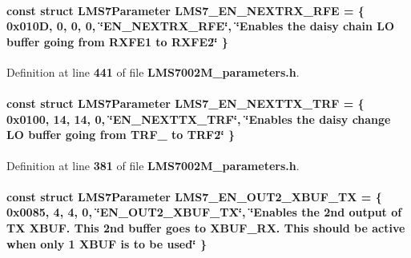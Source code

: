 \paragraph[{L\+M\+S7\+\_\+\+E\+N\+\_\+\+N\+E\+X\+T\+R\+X\+\_\+\+R\+FE}]{\setlength{\rightskip}{0pt plus 5cm}const struct {\bf L\+M\+S7\+Parameter} L\+M\+S7\+\_\+\+E\+N\+\_\+\+N\+E\+X\+T\+R\+X\+\_\+\+R\+FE = \{ 0x010\+D, 0, 0, 0, \char`\"{}\+E\+N\+\_\+\+N\+E\+X\+T\+R\+X\+\_\+\+R\+F\+E\char`\"{}, \char`\"{}\+Enables the daisy chain L\+O buffer going from R\+X\+F\+E1 to R\+X\+F\+E2\char`\"{} \}\hspace{0.3cm}{\ttfamily [static]}}\label{LMS7002M__parameters_8h_a2246756b31309afef876bca2d1533015}


Definition at line {\bf 441} of file {\bf L\+M\+S7002\+M\+\_\+parameters.\+h}.

\paragraph[{L\+M\+S7\+\_\+\+E\+N\+\_\+\+N\+E\+X\+T\+T\+X\+\_\+\+T\+RF}]{\setlength{\rightskip}{0pt plus 5cm}const struct {\bf L\+M\+S7\+Parameter} L\+M\+S7\+\_\+\+E\+N\+\_\+\+N\+E\+X\+T\+T\+X\+\_\+\+T\+RF = \{ 0x0100, 14, 14, 0, \char`\"{}\+E\+N\+\_\+\+N\+E\+X\+T\+T\+X\+\_\+\+T\+R\+F\char`\"{}, \char`\"{}\+Enables the daisy change L\+O buffer going from T\+R\+F\+\_ to T\+R\+F2\char`\"{} \}\hspace{0.3cm}{\ttfamily [static]}}\label{LMS7002M__parameters_8h_a58db97fb56537415060dde35e17818db}


Definition at line {\bf 381} of file {\bf L\+M\+S7002\+M\+\_\+parameters.\+h}.

\paragraph[{L\+M\+S7\+\_\+\+E\+N\+\_\+\+O\+U\+T2\+\_\+\+X\+B\+U\+F\+\_\+\+TX}]{\setlength{\rightskip}{0pt plus 5cm}const struct {\bf L\+M\+S7\+Parameter} L\+M\+S7\+\_\+\+E\+N\+\_\+\+O\+U\+T2\+\_\+\+X\+B\+U\+F\+\_\+\+TX = \{ 0x0085, 4, 4, 0, \char`\"{}\+E\+N\+\_\+\+O\+U\+T2\+\_\+\+X\+B\+U\+F\+\_\+\+T\+X\char`\"{}, \char`\"{}\+Enables the 2nd output of T\+X X\+B\+U\+F. This 2nd buffer goes to X\+B\+U\+F\+\_\+\+R\+X. This should be active when only 1 X\+B\+U\+F is to be used\char`\"{} \}\hspace{0.3cm}{\ttfamily [static]}}\label{LMS7002M__parameters_8h_a980fe6dde044c4deac59ee834a88eb0b}


